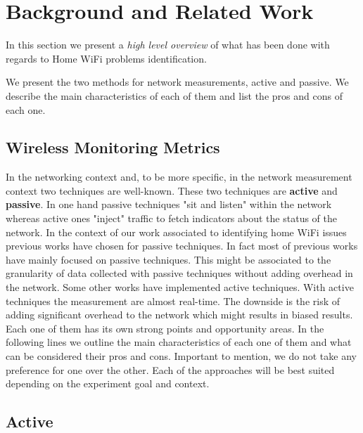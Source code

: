 \section{Background and Related Work}\label{Back_Related_Work}

In this section we present a \emph{high level overview} of what has been done with regards to Home WiFi problems identification.

We present the two methods for network measurements, active and passive. We describe the main characteristics of each of them and list the pros and cons of each one.

\subsection{Wireless Monitoring Metrics}\label{Wireless Monitoring Metrics}

In the networking context and, to be more specific, in the network measurement context two techniques are well-known. These two techniques are \textbf{active} and \textbf{passive}. In one hand passive techniques "sit and listen" within the network whereas active ones "inject" traffic to fetch indicators about the status of the network. In the context of our work associated to identifying home WiFi issues previous works \cite{hostview} \cite{passive_wifi_capacity_estimation} have chosen for passive techniques. In fact most of previous works have mainly focused on passive techniques. This might be associated to the granularity of data collected with passive techniques without adding overhead in the network. Some other works \cite{can_user_level_probing} have implemented active techniques. With active techniques the measurement are almost real-time. The downside is the risk of adding significant overhead to the network which might results in biased results. Each one of them has its own strong points and opportunity areas. In the following lines we outline the main characteristics of each one of them and what can be considered their pros and cons. Important to mention, we do not take any preference for one over the other. Each of the approaches will be best suited depending on the experiment goal and context.

\subsection*{Active}

